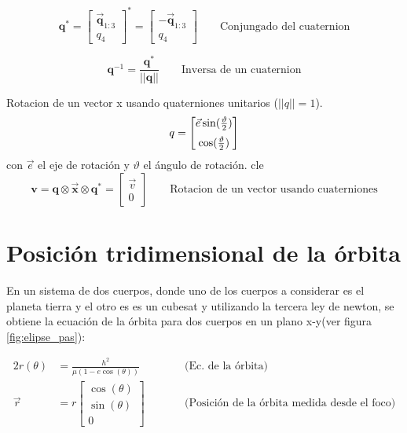 \begin{equation}
	\mathbf{q}^* = 
	\begin{bmatrix}
		\vec{\mathbf{q}}_{1:3} \\ 
		q_4
	\end{bmatrix}^* = 
	\begin{bmatrix}
		-\vec{\mathbf{q}}_{1:3} \\ 
		q_4
	\end{bmatrix} \qquad \text{Conjungado del cuaternion} 
\end{equation}


\begin{equation}
	\mathbf{q}^{-1} = \frac{\mathbf{q}^*}{||\mathbf{q}||} \qquad \text{Inversa de un cuaternion}
\end{equation}

Rotacion de un vector x usando quaterniones unitarios ($||q|| = 1 $). 
\begin{equation}
	\textbf{q} = \begin{bmatrix}
 		\vspace{2mm}
 		\vec{e} \sin(\frac{\vartheta}{2} ) \\
		\cos(\frac{\vartheta}{2} )
	\end{bmatrix}
\end{equation}
con $\vec{e}$ el eje de rotación y $\vartheta$ el ángulo de rotación. cle
\begin{equation}
	\mathbf{v} = \mathbf{q} \otimes \vec{ \mathbf{x}}  \otimes \mathbf{q}^* = 
	\begin{bmatrix}
		\vec{v} \\
		0
	\end{bmatrix}
	 \qquad \text{Rotacion de un vector usando cuaterniones}
\end{equation}

\section{Posición tridimensional de la órbita}

En un sistema de dos cuerpos, donde uno de los cuerpos a considerar es el planeta tierra y el otro es es un cubesat y utilizando la tercera ley de newton, se obtiene la ecuación de la órbita para dos cuerpos en un plano x-y(ver figura \ref{fig:elipse_pas}): 

\begin{alignat}{2}
r(\theta) &= \frac{h^2}{\mu (1 - e \cos(\theta))} &\qquad& \text{(Ec. de la órbita)} \\
\vec{r}   &= r \begin{bmatrix}
	\cos(\theta) \\ 
	\sin(\theta) \\ 
	0
\end{bmatrix} && \text{(Posición de la órbita medida desde el foco)}
\end{alignat}


